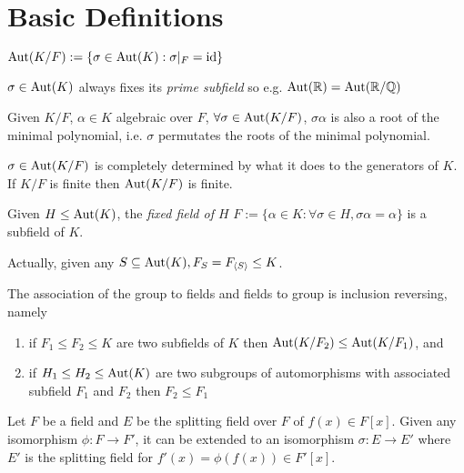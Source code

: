 \documentclass[a4paper]{article}
\begin{document}
\maketitle

\tableofcontents

\section{Basic Definitions}

\begin{defi}
    $\operatorname{Aut}(K/F) := \{\sigma \in \operatorname{Aut}(K): \sigma|_F = \operatorname{id} \}$
\end{defi}

$\sigma \in \operatorname{Aut}(K)$ always fixes its \emph{prime subfield} so e.g. $\aut(\mathbb{R}) = \aut(\mathbb{R}/\mathbb{Q})$

\begin{prop}
  \label{prop:permutation}
    Given $K/F$, $\alpha \in K$ algebraic over $F$, $\forall\sigma \in \operatorname{Aut}(K/F)$, $\sigma\alpha$ is also a root of the minimal polynomial, i.e. $\sigma$ permutates the roots of the minimal polynomial.
\end{prop}

$\sigma \in \operatorname{Aut}(K/F)$ is completely determined by what it does to the generators of $K$. If $K/F$ is finite then $\operatorname{Aut}(K/F)$ is finite.

\begin{prop}
    Given $H \leq \operatorname{Aut}(K)$, the \emph{fixed field of $H$} $F := \{\alpha \in K:\forall\sigma \in H, \sigma\alpha = \alpha\}$ is a subfield of $K$.
\end{prop}

Actually, given any $S \subseteq \operatorname{Aut}(K), F_S = F_{\langle S \rangle} \leq K$.

\begin{prop}
    The association of the group to fields and fields to group is inclusion reversing, namely

    \begin{enumerate}
        \item if $F_1 \leq F_2 \leq K$ are two subfields of $K$ then $\operatorname{Aut}(K/F_2) \leq \operatorname{Aut}(K/F_1)$, and
        \item if $H_1 \leq H_2 \leq \operatorname{Aut}(K)$ are two subgroups of automorphisms with associated subfield $F_1$ and $F_2$ then $F_2 \leq F_1$
    \end{enumerate}

\end{prop}

Let $F$ be a field and $E$ be the splitting field over $F$ of $f(x) \in F[x]$. Given any isomorphism $\phi: F \rightarrow F'$, it can be extended to an isomorphism $\sigma: E \rightarrow E'$ where $E'$ is the splitting field for $f'(x) = \phi(f(x)) \in F'[x]$.
\end{document}
